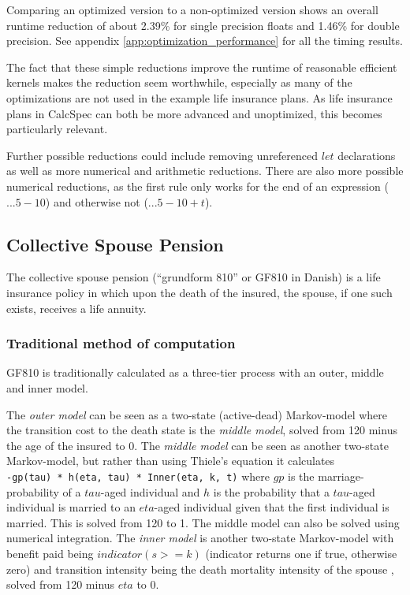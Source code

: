 Comparing an optimized version to a non-optimized version shows an overall runtime reduction of about 2.39\% for single precision floats and 1.46\% for double precision.
See appendix \ref{app:optimization_performance} for all the timing results.

The fact that these simple reductions improve the runtime of reasonable efficient kernels makes the reduction seem worthwhile, especially as many of the optimizations are not used in the example life insurance plans.
As life insurance plans in CalcSpec can both be more advanced and unoptimized, this becomes particularly relevant.

Further possible reductions could include removing unreferenced $let$ declarations as well as more numerical and arithmetic reductions.
There are also more possible numerical reductions, as the first rule only works for the end of an expression ($... 5 - 10$) and otherwise not ($... 5 - 10 + t$).

\subsection{Collective Spouse Pension}\label{sub:gf810}
The collective spouse pension (``grundform 810'' or GF810 in Danish) is a life insurance policy in which upon the death of the insured, the spouse, if one such exists, receives a life annuity.

\subsubsection{Traditional method of computation}
GF810 is traditionally calculated as a three-tier process with an outer, middle and inner model.

The \emph{outer model} can be seen as a two-state (active-dead) Markov-model where the transition cost to the death state is the \emph{middle model}, solved from 120 minus the age of the insured to 0.
The \emph{middle model} can be seen as another two-state Markov-model, but rather than using Thiele's equation it calculates \\\lstinline$-gp(tau) * h(eta, tau) * Inner(eta, k, t)$ where $gp$ is the marriage-probability of a $tau$-aged individual and $h$ is the probability that a $tau$-aged individual is married to an $eta$-aged individual given that the first individual is married.
This is solved from 120 to 1. The middle model can also be solved using numerical integration.
The \emph{inner model} is another two-state Markov-model with benefit paid being $indicator(s >= k)$ (indicator returns one if true, otherwise zero) and transition intensity being the death mortality intensity of the spouse , solved from 120 minus $eta$ to 0.

